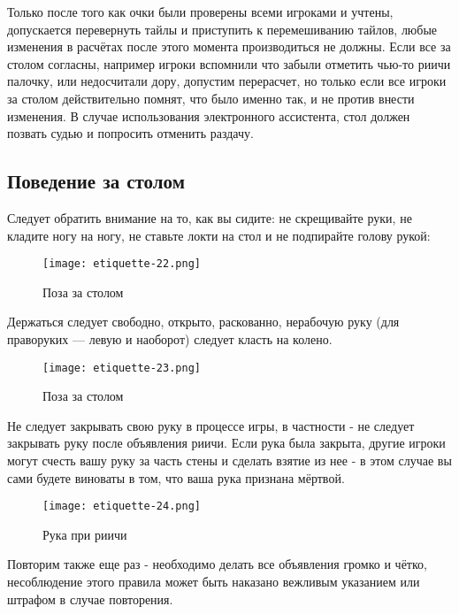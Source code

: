 Только после того как очки были проверены всеми игроками и учтены, допускается перевернуть тайлы и приступить к перемешиванию тайлов, любые изменения в расчётах после этого момента производиться не должны. Если все за столом согласны, например игроки вспомнили что забыли отметить чью-то риичи палочку, или недосчитали дору, допустим перерасчет, но только если все игроки за столом действительно помнят, что было именно так, и не против внести изменения. В случае использования электронного ассистента, стол должен позвать судью и попросить отменить раздачу.

\subsection{Поведение за столом}

Следует обратить внимание на то, как вы сидите: не скрещивайте руки, не кладите ногу на ногу, не ставьте локти на стол и не подпирайте голову рукой:

\begin{figure}[H]
	\centering
	\texttt{[image: etiquette-22.png]}
	\caption{Поза за столом}
\end{figure}

Держаться следует свободно, открыто, раскованно, нерабочую руку (для праворуких — левую и наоборот) следует класть на колено.

\begin{figure}[H]
	\centering
	\texttt{[image: etiquette-23.png]}
	\caption{Поза за столом}
\end{figure}

Не следует закрывать свою руку в процессе игры, в частности - не следует закрывать руку после объявления риичи. Если рука была закрыта, другие игроки могут счесть вашу руку за часть стены и сделать взятие из нее - в этом случае вы сами будете виноваты в том, что ваша рука признана мёртвой.

\begin{figure}[H]
	\centering
	\texttt{[image: etiquette-24.png]}
	\caption{Рука при риичи}
\end{figure}

Повторим также еще раз - необходимо делать все объявления громко и чётко, несоблюдение этого правила может быть наказано вежливым указанием или штрафом в случае повторения.
